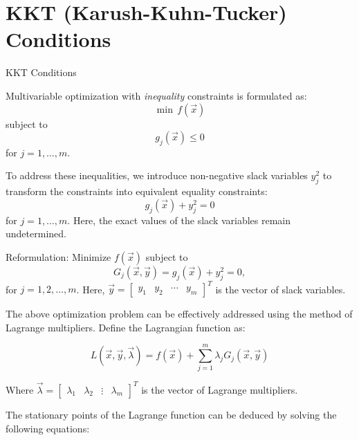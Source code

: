 \documentclass[
    NAME={Dr. Helga Ingimundardóttir},
    EMAIL={helgaingim@hi.is},
    FACULTY={Industrial Engineering},
    TITLE={Nonlinear Optimization},
    SUBTITLE={Approaches and Challenges},
    SEMINAR={VÉL113F},
    DATE={Design and Optimization}
]{../HI-latex/hi-beamer}
\begin{document}
    \section{KKT (Karush-Kuhn-Tucker) Conditions}
    \begin{frame}{KKT Conditions}

        Multivariable optimization with \emph{inequality} constraints is formulated as:
        \[ \min \, f(\vec{x}) \]
        subject to
        \[ g_j(\vec{x}) \leq 0 \]
        for \( j = 1, \ldots, m \).

        To address these inequalities, we introduce non-negative slack variables $y_j^2$ to transform the
        constraints into equivalent equality constraints:
        \[ g_j(\vec{x}) + y_j^2 = 0 \]
        for \( j = 1, \ldots, m \).
        Here, the exact values of the slack variables remain undetermined.

        \framebreak
        \alert{Reformulation}:
        Minimize \( f(\vec{x}) \) subject to
        \[ G_j(\vec{x},\vec{y}) = g_j(\vec{x}) + y_j^2 = 0, \]
        for \( j = 1, 2, \ldots, m \).
        Here, \( \vec{y} = \begin{bmatrix}
                               y_1 & y_2 & \cdots & y_m
        \end{bmatrix}^T \) is the vector of slack variables.

        \bigskip

        The above optimization problem can be effectively addressed using the method of Lagrange multipliers.
        Define the Lagrangian function as:

        \[ L(\vec{x},\vec{y},\vec{\lambda}) = f(\vec{x}) + \sum_{j=1}^m \lambda_j G_j(\vec{x},\vec{y}) \]

        Where \( \vec{\lambda} = \begin{bmatrix}
                                     \lambda_1 & \lambda_2 & \vdots & \lambda_m
        \end{bmatrix}^T \) is
        the vector of Lagrange multipliers.

        \framebreak

        The stationary points of the Lagrange function can be deduced by solving the following equations:


\end{frame}
\end{document}
